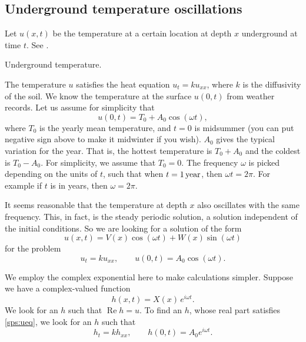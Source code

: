 \documentclass{ximera}
\begin{document}
\subsection{Underground temperature oscillations}

Let $u(x,t)$ be the temperature at a certain location at depth $x$ underground at time $t$.  See .

\begin{mywrapfig}{2.65in}
    \capstart
    
    \caption{Underground temperature.\label{sps:groundtempfig}}
\end{mywrapfig}

The temperature $u$ satisfies the heat equation $u_t = ku_{xx}$, where $k$ is the diffusivity of the soil. We know the temperature at the surface $u(0,t)$ from weather records.  Let us assume for simplicity that
\begin{equation*}
    u(0,t) = T_0 + A_0 \cos (\omega t) ,
\end{equation*}
where $T_0$ is the yearly mean temperature, and $t=0$ is midsummer (you can put negative sign above to make it midwinter if you wish).  $A_0$ gives the typical variation for the year.  That is, the hottest temperature is $T_0 + A_0$ and the coldest is $T_0 - A_0$. For simplicity, we assume that $T_0 = 0$. The frequency $\omega$ is picked depending on the units of $t$, such that when $t=\unit[1]{year}$, then $\omega t = 2 \pi$.  For example if $t$ is in years, then $\omega = 2\pi$.

It seems reasonable that the temperature at depth $x$ also oscillates with the same frequency.  This, in fact, is the steady periodic solution, a solution independent of the initial conditions. So we are looking for a solution of the form
\begin{equation*}
    u(x,t) = V(x) \cos (\omega t) + W (x) \sin ( \omega t)
\end{equation*}
for the problem
\begin{equation} \label{sps:ueq}
    u_t = k u_{xx}, \qquad u(0,t) = A_0 \cos ( \omega t) .
\end{equation}

We employ the complex exponential here to make calculations simpler. Suppose we have a complex-valued function
\begin{equation*}
    h(x,t) = X(x)\, e^{i\omega t} .
\end{equation*}
We look for an $h$ such that $\operatorname{Re} h = u$. To find an $h$, whose real part satisfies \eqref{sps:ueq}, we look for an $h$ such that
\begin{equation} \label{sps:heq}
    h_t = k h_{xx}, \qquad h(0,t) = A_0 e^{i\omega t} .
\end{equation}
\end{document}
